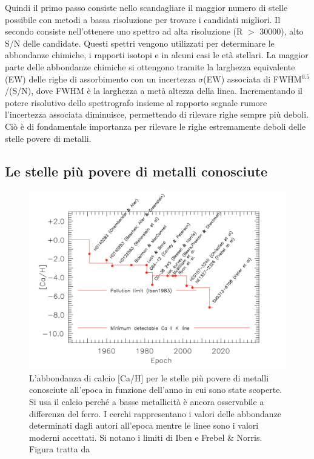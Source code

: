 \documentclass[12pt]{article}
\begin{document}
Quindi il primo passo consiste nello scandagliare il maggior numero di stelle possibile con metodi a bassa risoluzione per trovare i candidati migliori.
Il secondo consiste nell’ottenere uno spettro ad alta risoluzione (R $>$ 30000), alto S/N delle candidate. Questi spettri vengono utilizzati per determinare le abbondanze chimiche, i rapporti isotopi e in alcuni casi le età stellari. La maggior parte delle abbondanze chimiche si ottengono tramite la larghezza equivalente (EW) delle righe di assorbimento con un incertezza $\sigma$(EW) associata di FWHM$^{0.5}$/(S/N), dove FWHM è la larghezza a metà altezza della linea. Incrementando il potere risolutivo dello spettrografo insieme al rapporto segnale rumore l’incertezza associata diminuisce, permettendo di rilevare righe sempre più deboli. Ciò è di fondamentale importanza per rilevare le righe estremamente deboli delle stelle povere di metalli. 


\subsection{Le stelle più povere di metalli conosciute}
\label{povere}
\begin{figure}[htp!]
\center
  \includegraphics[width=0.9 \textwidth]{epoch}
  \caption{ L’abbondanza di calcio [Ca/H] per le stelle più povere di metalli conosciute all’epoca in funzione dell’anno in cui sono state scoperte. Si usa il calcio perché a basse metallicità è ancora osservabile a differenza del ferro. I cerchi rappresentano i valori delle abbondanze determinati dagli autori all’epoca mentre le linee sono i valori moderni accettati. Si notano i limiti di Iben e Frebel $\&$ Norris. Figura tratta da \cite{principale}}
  \label{epoch}
\end{figure}
\
\end{document}
